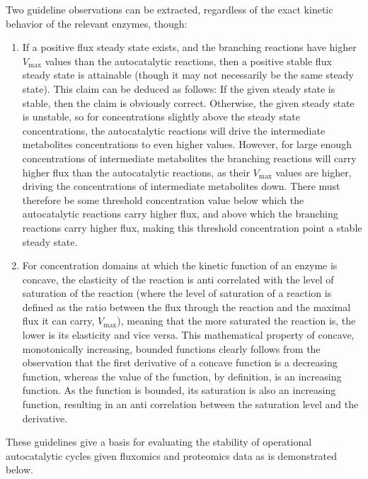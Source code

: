 \documentclass[a4page,notitlepage]{article}
\begin{document}
    Two guideline observations can be extracted, regardless of the exact kinetic behavior of the relevant enzymes, though:
    \begin{enumerate}
        \item If a positive flux steady state exists, and the branching reactions have higher $V_{\max}$ values than the autocatalytic reactions, then a positive stable flux steady state is attainable (though it may not necessarily be the same steady state).
        This claim can be deduced as follows:
        If the given steady state is stable, then the claim is obviously correct.
        Otherwise, the given steady state is unstable, so for concentrations slightly above the steady state concentrations, the autocatalytic reactions will drive the intermediate metabolites concentrations to even higher values.
        However, for large enough concentrations of intermediate metabolites the branching reactions will carry higher flux than the autocatalytic reactions, as their $V_{\max}$ values are higher, driving the concentrations of intermediate metabolites down.
        There must therefore be some threshold concentration value below which the autocatalytic reactions carry higher flux, and above which the branching reactions carry higher flux, making this threshold concentration point a stable steady state.
    \item For concentration domains at which the kinetic function of an enzyme is concave, the elasticity of the reaction is anti correlated with the level of saturation of the reaction (where the level of saturation of a reaction is defined as the ratio between the flux through the reaction and the maximal flux it can carry, $V_{\max}$), meaning that the more saturated the reaction is, the lower is its elasticity and vice versa.
          This mathematical property of concave, monotonically increasing, bounded functions clearly follows from the observation that the first derivative of a concave function is a decreasing function, whereas the value of the function, by definition, is an increasing function. 
          As the function is bounded, its saturation is also an increasing function, resulting in an anti correlation between the saturation level and the derivative.
    \end{enumerate}

    These guidelines give a basis for evaluating the stability of operational autocatalytic cycles given fluxomics and proteomics data as is demonstrated below.
\end{document}
